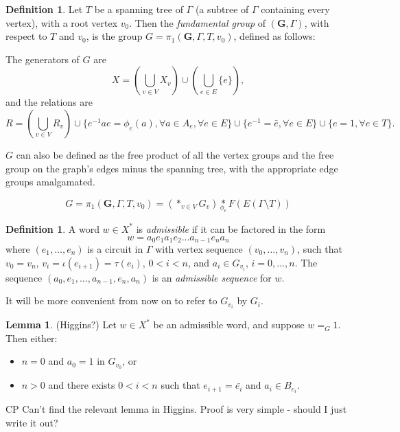 \documentclass[a4paper]{article}
\newcommand{\fgoagog}{\pi_1(\mathbf{G},\Gamma,T,v_0)}	%
\theoremstyle{plain}
\theoremstyle{definition}
\newtheorem{lemma}[theorem]{Lemma}
\newtheorem{definition}[theorem]{Definition}
\newenvironment{cpe}{\noindent\color{OliveGreen} CP }{}
\newcommand{\cp}[1]{
\begin{cpe} #1 \end{cpe}}
\begin{document}
\begin{definition}
Let $T$ be a spanning tree of $\Gamma$ (a subtree of $\Gamma$ containing every vertex), with a root vertex $v_0$. Then the {\it fundamental group} of $(\mathbf{G},\Gamma)$, with respect to $T$ and $v_0$, is the group $G = \fgoagog$, defined as follows:

The generators of $G$ are
\[ X = \left( \bigcup_{v \in V}X_v \right) \cup \left( \bigcup_{e \in E}\{e\} \right),\]
and the relations are 
\[ R = \left( \bigcup_{v \in V}R_v \right) \cup \{e^{-1}ae = \phi_e(a),  \forall a \in A_e, \forall e \in E\} \cup \{ e^{-1} = \bar{e}, \forall e \in E\} \cup \{ e = 1, \forall e \in T \}.\]

$G$ can also be defined as the free product of all the vertex groups and the free group on the graph's edges minus the spanning tree, with the appropriate edge groups amalgamated.

\begin{equation}
G = \fgoagog = \left( \ast_{v \in V} G_v \right) \underset{\phi_e}{\ast} F(E(\Gamma \setminus T))
\end{equation}

\end{definition}

\begin{definition}
A word $w \in X^{\ast}$ is {\it admissible} if it can be factored in the form
\[ w = a_0 e_1 a_1 e_2 \dots a_{n-1} e_n a_n \]
where $(e_1,\dots,e_n)$ is a circuit in $\Gamma$ with vertex sequence $(v_0,\dots,v_n)$, such that $v_0 = v_n$, $v_i = \iota(e_{i+1})=\tau(e_i)$, $0 < i < n$, and $a_i \in G_{v_i}$, $i=0,\dots,n$. The sequence $(a_0,e_1, \dots, a_{n-1},e_n,a_n)$ is an {\it admissible sequence} for $w$.
\end{definition}

It will be more convenient from now on to refer to $G_{v_i}$ by $G_i$.

\begin{lemma}
\label{trivialnormalform}
(Higgins?)
Let $w \in X^{\ast}$ be an admissible word, and suppose $w =_G 1$. Then either:
\begin{itemize}
	\item $n=0$ and $a_0=1$ in $G_{v_0}$, or
	\item $n > 0$ and there exists $0<i<n$ such that $e_{i+1}=\bar{e_i}$ and $a_i \in B_{e_i}$.
\end{itemize}
\end{lemma}
\cp{Can't find the relevant lemma in Higgins. Proof is very simple - should I just write it out?}
\end{document}
